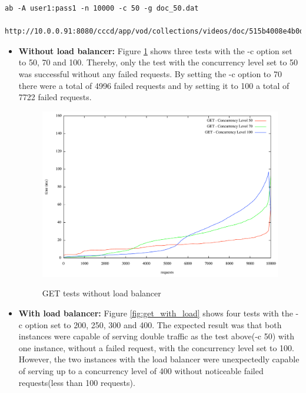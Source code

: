 \begin{code}
\begin{verbatim}
ab -A user1:pass1 -n 10000 -c 50 -g doc_50.dat 
 http://10.0.0.91:8080/cccd/app/vod/collections/videos/doc/515b4008e4b0da706f84c1a9
\end{verbatim}
\end{code}

\begin{itemize}
\item{\textbf{Without load balancer:}} Figure \ref{fig:get_without_load} shows three tests with the -c option set to 50, 70 and 100. Thereby, only the test with the concurrency level set to 50 was successful without any failed requests. By setting the -c option to 70 there were a total of 4996 failed requests and by setting it to 100 a total of 7722 failed requests.

\begin{figure}[htb]
  \centering
  \includegraphics[scale=0.4]{img/Without_LoadBalancer_100_70_50_GET}\\
  \caption{GET tests without load balancer}
  \label{fig:get_without_load}
\end{figure}

\item{\textbf{With load balancer:}} Figure \ref{fig:get_with_load} shows four tests with the -c option set to 200, 250, 300 and 400. The expected result was that both instances were capable of serving double traffic as the test above(-c 50) with one instance, without a failed request, with the concurrency level set to 100. However, the two instances with the load balancer were unexpectedly capable of serving up to a concurrency level of 400 without noticeable failed requests(less than 100 requests).


\end{itemize}
